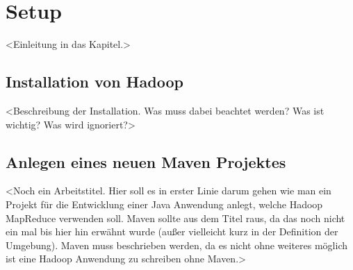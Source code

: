 
\chapter{Setup}\label{cha:Setup}
<Einleitung in das Kapitel.>

\section{Installation von Hadoop}
<Beschreibung der Installation. Was muss dabei beachtet werden? Was ist wichtig? Was wird ignoriert?>

\section{Anlegen eines neuen Maven Projektes}
<Noch ein Arbeitstitel. Hier soll es in erster Linie darum gehen wie man ein Projekt für die Entwicklung einer Java Anwendung anlegt, welche Hadoop MapReduce verwenden soll. Maven sollte aus dem Titel raus, da das noch nicht ein mal bis hier hin erwähnt wurde (außer vielleicht kurz in der Definition der Umgebung). Maven muss beschrieben werden, da es nicht ohne weiteres möglich ist eine Hadoop Anwendung zu schreiben ohne Maven.>